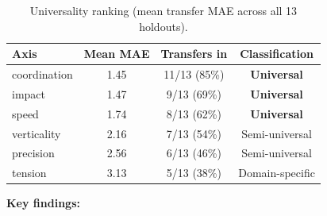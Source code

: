 \documentclass[11pt]{article}
\begin{document}
\begin{table}[h]
\centering
\caption{Universality ranking (mean transfer MAE across all 13 holdouts).}
\label{tab:universality}
\begin{tabular}{lccc}
\toprule
\textbf{Axis} & \textbf{Mean MAE} & \textbf{Transfers in} & \textbf{Classification} \\
\midrule
coordination & 1.45 & 11/13 (85\%) & \textbf{Universal} \\
impact & 1.47 & 9/13 (69\%) & \textbf{Universal} \\
speed & 1.74 & 8/13 (62\%) & \textbf{Universal} \\
verticality & 2.16 & 7/13 (54\%) & Semi-universal \\
precision & 2.56 & 6/13 (46\%) & Semi-universal \\
tension & 3.13 & 5/13 (38\%) & Domain-specific \\
\bottomrule
\end{tabular}
\end{table}

\textbf{Key findings:}
\end{document}
